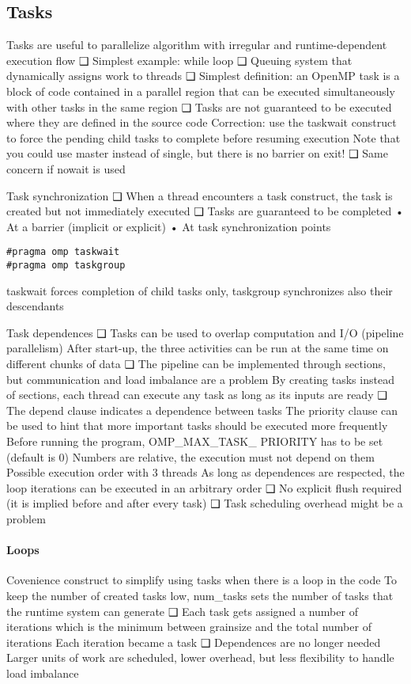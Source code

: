 \subsection{Tasks}
Tasks are useful to parallelize algorithm with
irregular and runtime-dependent execution flow
❑ Simplest example: while loop
❑ Queuing system that dynamically assigns work
to threads
❑ Simplest definition: an OpenMP task is a block
of code contained in a parallel region that can
be executed simultaneously with other tasks in
the same region
❑ Tasks are not guaranteed to be executed where
they are defined in the source code
Correction: use the
taskwait construct to
force the pending child
tasks to complete
before resuming
execution
Note that you could use master instead of
single, but there is no barrier on exit!
❑ Same concern if nowait is used

Task synchronization
❑ When a thread encounters a task construct, the
task is created but not immediately executed
❑ Tasks are guaranteed to be completed
• At a barrier (implicit or explicit)
• At task synchronization points
\begin{lstlisting}[style=C]
#pragma omp taskwait 
#pragma omp taskgroup
\end{lstlisting}
taskwait forces completion of child tasks only,
taskgroup synchronizes also their descendants


Task dependences
❑ Tasks can be used to overlap computation and
I/O (pipeline parallelism)
After start-up, the three activities can be run at
the same time on different chunks of data
❑ The pipeline can be implemented through
sections, but communication and load imbalance
are a problem
By creating tasks instead of sections, each thread
can execute any task as long as its inputs are
ready
❑ The depend clause indicates a dependence
between tasks
The priority clause can be used to hint that
more important tasks should be executed more
frequently
Before running
the program,
OMP_MAX_TASK_
PRIORITY has to
be set (default
is 0)
Numbers are
relative, the
execution must
not depend on
them
Possible execution order with 3 threads
As long as dependences are respected, the loop
iterations can be executed in an arbitrary order
❑ No explicit flush required (it is implied before
and after every task)
❑ Task scheduling overhead might be a problem

\paragraph*{Loops}
Covenience construct to simplify using tasks
when there is a loop in the code
To keep the number of created tasks low,
num_tasks sets the number of tasks that the
runtime system can generate
❑ Each task gets assigned a number of iterations
which is the minimum between grainsize and
the total number of iterations
Each iteration became a task
❑ Dependences are no longer needed
Larger units of work are scheduled, lower
overhead, but less flexibility to handle load
imbalance

